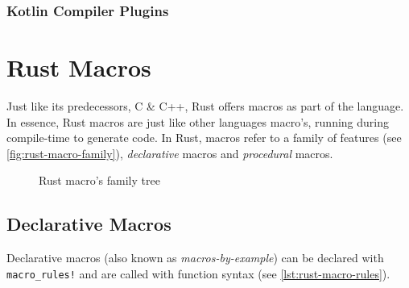 \subsubsection*{Kotlin Compiler Plugins}\label{sec:lang-preprocessors:kotlin:annotation}


\section{Rust Macros}\label{sec:rust-macros}

Just like its predecessors, C \& C++, Rust offers macros as part of the language.
In essence, Rust macros are just like other languages macro's, running during compile-time to generate code.
In Rust, macros refer to a family of features (see \autoref{fig:rust-macro-family}),
\emph{declarative} macros and \emph{procedural} macros.

\begin{figure}
    \centering
    \caption{Rust macro's family tree}
    \label{fig:rust-macro-family}
\end{figure}

\subsection{Declarative Macros}\label{sec:rust-macros:decl}

Declarative macros (also known as \emph{macros-by-example}) can be declared with \texttt{macro\_rules!}
and are called with function syntax (see \autoref{lst:rust-macro-rules}).


